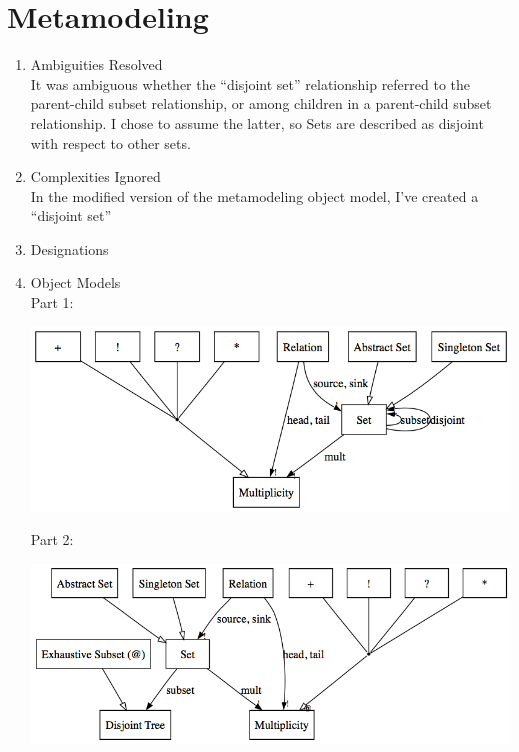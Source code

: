 \documentclass[11pt,letterpaper]{article}
\begin{document}
\section{Metamodeling}
\begin{enumerate}
\item Ambiguities Resolved\\
It was ambiguous whether the ``disjoint set'' relationship referred to the parent-child subset relationship, or among children in a parent-child subset relationship. I chose to assume the latter, so Sets are described as disjoint with respect to other sets.

\item Complexities Ignored\\
In the modified version of the metamodeling object model, I've created a ``disjoint set''
\item Designations\\

\item Object Models\\
Part 1:
\begin{center}
\includegraphics[width=400pt]{dot/metamodeling.png}
\label{fig:ob7} 
\end{center}

Part 2:
\begin{center}
\includegraphics[width=400pt]{dot/metamodeling2.png}
\label{fig:ob8} 
\end{center}
\end{enumerate}
\end{document}
